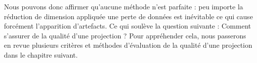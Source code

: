 Nous pouvons donc affirmer qu'aucune méthode n’est parfaite : peu importe la réduction de dimension appliquée une perte de données est inévitable ce qui cause forcément l’apparition d’artefacts. Ce qui soulève la question suivante : Comment s’assurer de la qualité d’une projection ? 
Pour appréhender cela, nous passerons en revue plusieurs critères et méthodes d'évaluation de la qualité d'une projection dans le chapitre suivant.




